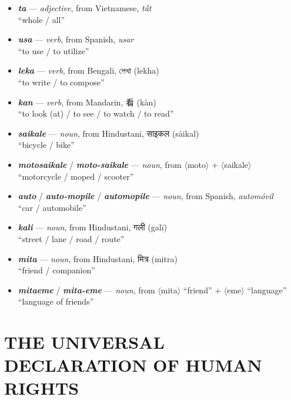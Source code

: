 \documentclass[a4paper]{article}
\begin{document}
\begin{itemize}
	\item \textbf{\textit{ta}} — \textit{adjective}, from Vietnamese, \textit{tất} \\``whole / all''
	\item \textbf{\textit{usa}} — \textit{verb}, from Spanish, \textit{usar} \\``to use /  to utilize''
	\item \textbf{\textit{leka}} — \textit{verb}, from Bengali, {\benfont লেখা} (lekha) \\``to write /  to compose''
	\item \textbf{\textit{kan}} — \textit{verb}, from Mandarin, 看 (kàn) \\``to look (at) / to see / to watch / to read''
	\item \textbf{\textit{saikale}}  — \textit{noun}, from Hindustani, {\hmfont साइकल} (sāikal) \\``bicycle / bike''
	\item \textbf{\textit{motosaikale}} / \textbf{\textit{moto-saikale}}  — \textit{noun}, from $\langle$moto$\rangle$ + $\langle$saikale$\rangle$ \\``motorcycle / moped / scooter''
	\item \textbf{\textit{auto}} / \textbf{\textit{auto-mopile}} / \textbf{\textit{automopile}}  — \textit{noun}, from Spanish, \textit{automóvil} \\``car / automobile''
	\item \textbf{\textit{kali}}  — \textit{noun}, from Hindustani, {\hmfont गली} (galī) \\ ``street / lane / road / route''
	\item \textbf{\textit{mita}}  — \textit{noun}, from Hindustani, {\hmfont मित्र} (mitra) \\ ``friend / companion''
	\item \textbf{\textit{mitaeme}} / \textbf{\textit{mita-eme}}  — \textit{noun}, from $\langle$mita$\rangle$ ``friend'' + $\langle$eme$\rangle$ ``language'' \\ ``language of friends''
	
\end{itemize}

\section{THE UNIVERSAL DECLARATION OF HUMAN RIGHTS}
\end{document}

